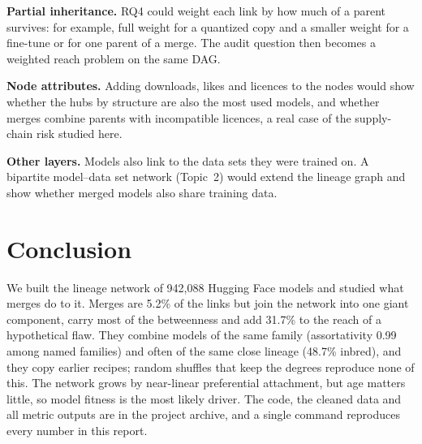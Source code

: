 \documentclass[conference]{IEEEtran}
\begin{document}
\textbf{Partial inheritance.} RQ4 could weight each link by how much of a
parent survives: for example, full weight for a quantized copy and a smaller
weight for a fine-tune or for one parent of a merge. The audit question then
becomes a weighted reach problem on the same DAG.

\textbf{Node attributes.} Adding downloads, likes and licences to the nodes
would show whether the hubs by structure are also the most used models, and
whether merges combine parents with incompatible licences, a real case of the
supply-chain risk studied here.

\textbf{Other layers.} Models also link to the data sets they were trained on.
A bipartite model--data set network (Topic~2) would extend the lineage graph
and show whether merged models also share training data.

\section{Conclusion}

We built the lineage network of 942,088 Hugging Face models and studied what
merges do to it. Merges are 5.2\% of the links but join the network into one
giant component, carry most of the betweenness and add 31.7\% to the reach of a
hypothetical flaw. They combine models of the same family (assortativity 0.99
among named families) and often of the same close lineage (48.7\% inbred), and
they copy earlier recipes; random shuffles that keep the degrees reproduce none
of this. The network grows by near-linear preferential attachment, but age
matters little, so model fitness is the most likely driver. The code, the
cleaned data and all metric outputs are in the project archive, and a single
command reproduces every number in this report.
\end{document}

